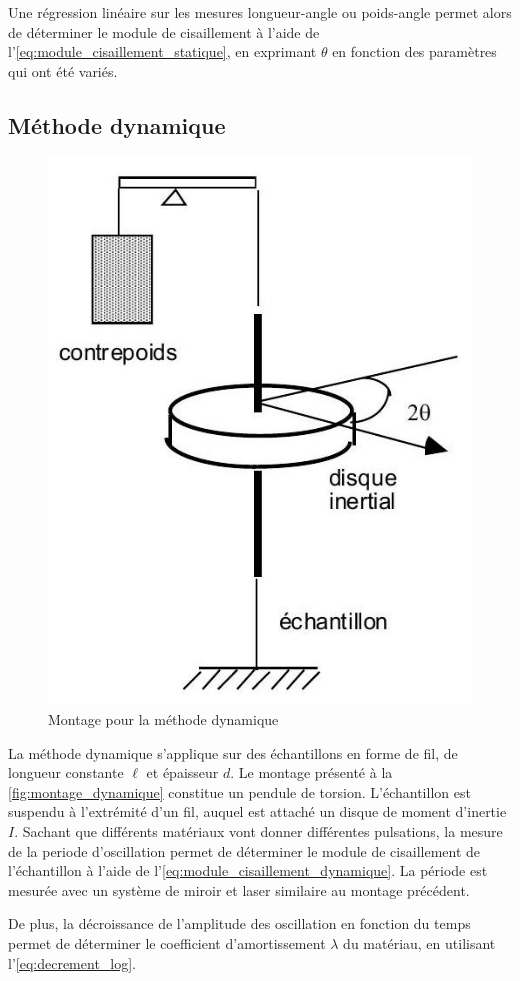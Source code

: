 Une régression linéaire sur les mesures longueur-angle ou poids-angle permet alors de déterminer le module de cisaillement à l'aide de l'\autoref{eq:module_cisaillement_statique}, en exprimant $\theta$ en fonction des paramètres qui ont été variés.

\subsection{Méthode dynamique}

\begin{figure}
    \vspace*{-2cm}
    \centering
    \includegraphics[width=\linewidth]{figures/dynamique.png}
    \caption{Montage pour la méthode dynamique \cite{notice}}
    \label{fig:montage_dynamique}
    \vspace*{-1.5cm}
\end{figure}
La méthode dynamique s'applique sur des échantillons en forme de fil, de longueur constante $\ell$ et épaisseur $d$. Le montage présenté à la \autoref{fig:montage_dynamique} constitue un pendule de torsion. L'échantillon est suspendu à l'extrémité d'un fil, auquel est attaché un disque de moment d'inertie $I$. Sachant que différents matériaux vont donner différentes pulsations, la mesure de la periode d'oscillation permet de déterminer le module de cisaillement de l'échantillon à l'aide de l'\autoref{eq:module_cisaillement_dynamique}. La période est mesurée avec un système de miroir et laser similaire au montage précédent.

De plus, la décroissance de l'amplitude des oscillation en fonction du temps permet de déterminer le coefficient d'amortissement $\lambda$ du matériau, en utilisant l'\autoref{eq:decrement_log}.

